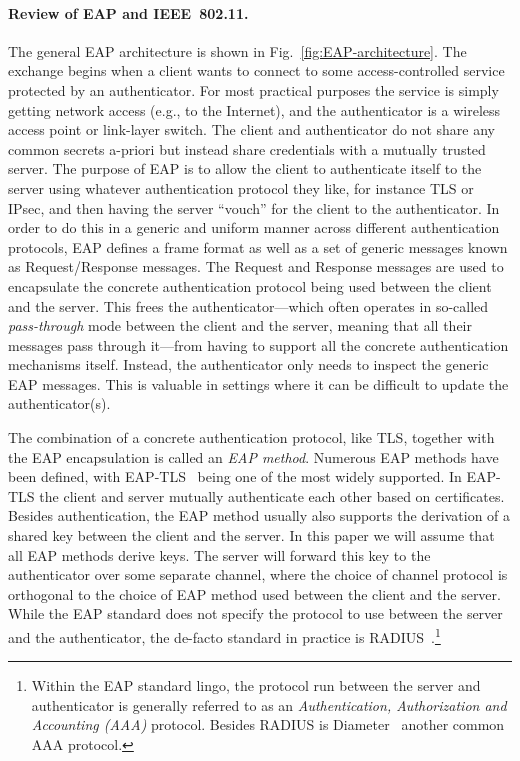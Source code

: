 \paragraph{Review of EAP and IEEE~802.11.}
The general EAP architecture is shown in Fig.~\ref{fig:EAP-architecture}.
The exchange begins when a client wants to connect to some access-controlled service protected by an authenticator.
For most practical purposes the service is simply getting network access (e.g., to the Internet),
and the authenticator is a wireless access point or link-layer switch.
The client and authenticator do not share any common secrets a-priori
but instead share credentials with a mutually trusted server. 
The purpose of EAP is to allow the client to authenticate itself to the server using whatever authentication protocol they like,
for instance TLS or IPsec,
and then having the server ``vouch'' for the client to the authenticator.
In order to do this in a generic and uniform manner across different authentication protocols,
EAP  defines a frame format as well as a set of generic  messages known as Request/Response messages.
The Request and Response messages are used to encapsulate the concrete authentication protocol being used between the client and the server.
This frees the authenticator---which 
often operates in so-called \emph{pass-through} mode between the client and the server,
meaning that all their messages pass through it---from
having to support all the concrete authentication mechanisms itself.
Instead,
the authenticator only needs to inspect the generic EAP messages.
This is valuable in settings where it can be difficult to update the authenticator(s).



The combination of a concrete authentication protocol,
like TLS,
together with the EAP encapsulation is called an \emph{EAP method}.
Numerous EAP methods have been defined,
with EAP-TLS~\cite{IETF:2008:RFC5216-EAP-TLS} being one of the most widely supported.
In EAP-TLS the client and server mutually authenticate each other based on certificates.
Besides authentication, the EAP method usually also supports the derivation of a shared key between the client and the server.
In this paper we will assume that all EAP methods derive keys. 
The server will forward this key to the authenticator over some separate channel,
where the choice of channel protocol is orthogonal to the choice of EAP method used between the client and the server.
While the EAP standard does not specify the protocol to use between the server and the authenticator,
the de-facto standard in practice is RADIUS~\cite{IETF:RFC:2865-RADIUS}.\footnote{Within 
the EAP standard lingo,
the protocol run between the server and authenticator is generally referred to as an \emph{Authentication, Authorization and Accounting (AAA)} protocol.
Besides RADIUS is Diameter~\cite{IETF:RFC:6733:DIAMETER} another common AAA protocol. 
}


